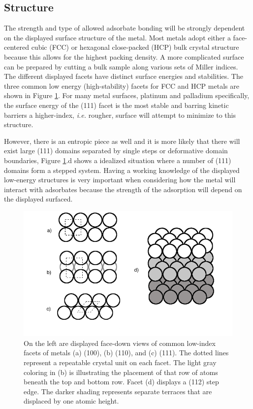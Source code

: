 \subsection{Structure}
The strength and type of allowed adsorbate bonding will be strongly dependent
on the displayed surface structure of the metal.  Most metals adopt either a
face-centered cubic (FCC) or hexagonal close-packed (HCP) bulk crystal
structure because this allows for the highest packing density. A more
complicated surface can be prepared by cutting a bulk sample along various sets
of Miller indices. The different displayed facets have distinct surface
energies and stabilities. The three common low energy (high-stability) facets
for FCC and HCP metals are shown in Figure \ref{fig:facets}. For many metal
surfaces, platinum and palladium specifically, the surface energy of the (111)
facet is the most stable and barring kinetic barriers a higher-index, {\it
i.e.} rougher, surface will attempt to minimize to this structure. 

However, there is an
entropic piece as well and it is more likely that there will exist large (111)
domains separated by single steps or deformative domain boundaries, Figure
\ref{fig:facets}.d shows a idealized situation where a number of (111) domains
form a stepped system. Having a working knowledge of the displayed low-energy
structures is very important when considering how the metal will interact with
adsorbates because the strength of the adsorption will depend on the
displayed surfaced.

\begin{figure}[p!]
  \includegraphics[width=\linewidth]{../figures/chap1/facets.pdf}
  \caption{On the left are displayed face-down views of common low-index facets
of metals (a) (100), (b) (110), and (c) (111). The dotted lines represent a
repeatable crystal unit on each facet. The light gray coloring in (b) is
illustrating the placement of that row of atoms beneath the top and bottom row.
Facet (d) displays a (112) step edge. The darker shading represents separate
terraces that are displaced by one atomic height.}
\label{fig:facets}
\end{figure}

